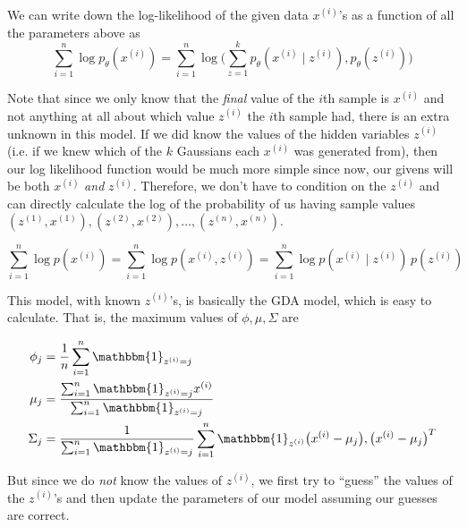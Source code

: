 \documentclass{article}
\begin{document}
  We can write down the log-likelihood of the given data $x^{(i)}$'s as a function of all the parameters above as
  \begin{equation}
    \sum_{i=1}^n \log p_\theta (x^{(i)}) = \sum_{i=1}^n \log \bigg( \sum_{z=1}^k  p_\theta ( x^{(i)} \mid z^{(i)} ) , p_\theta ( z^{(i)} ) \bigg)
  \end{equation}

  \begin{example}
    Note that since we only know that the \textit{final} value of the $i$th sample is $x^{(i)}$ and not anything at all about which value $z^{(i)}$ the $i$th sample had, there is an extra unknown in this model. If we did know the values of the hidden variables $z^{(i)}$ (i.e. if we knew which of the $k$ Gaussians each $x^{(i)}$ was generated from), then our log likelihood function would be much more simple since now, our givens will be both $x^{(i)}$ \textit{and} $z^{(i)}$. Therefore, we don't have to condition on the $z^{(i)}$ and can directly calculate the log of the probability of us having sample values $(z^{(1)}, x^{(1)}), (z^{(2)}, x^{(2)}), \ldots, (z^{(n)}, x^{(n)})$.

    \begin{equation}
      \sum_{i=1}^n \log p(x^{(i)}) = \sum_{i=1}^n \log p( x^{(i)}, z^{(i)}) = \sum_{i=1}^n \log p( x^{(i)} \mid z^{(i)}) \, p(z^{(i)})
    \end{equation}

    This model, with known $z^{(i)}$'s, is basically the GDA model, which is easy to calculate. That is, the maximum values of $\phi, \mu, \Sigma$ are

    \begin{align*}
      \phi_j & = \frac{1}{n} \sum_{i=1}^n \mathbbm{1}_{z^{(i)} = j} \\
      \mu_j & = \frac{\sum_{i=1}^n \mathbbm{1}_{z^{(i)} = j} x^{(i)}}{\sum_{i=1}^n \mathbbm{1}_{z^{(i)} = j}} \\
      \Sigma_j & = \frac{1}{\sum_{i=1}^n \mathbbm{1}_{z^{(i)} = j}} \sum_{i=1}^n \mathbbm{1}_{z^{(i)}} \big( x^{(i)} - \mu_j \big),\big(x^{(i)} - \mu_j \big)^T
    \end{align*}
  \end{example}

  But since we do \textit{not} know the values of $z^{(i)}$, we first try to ``guess'' the values of the $z^{(i)}$'s and then update the parameters of our model assuming our guesses are correct. 
\end{document}
